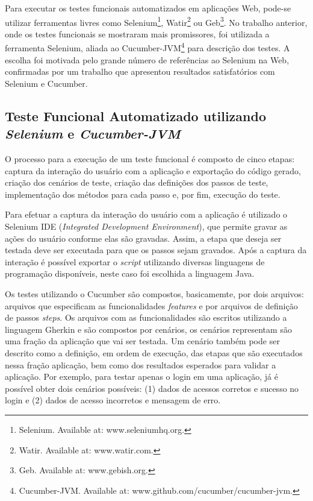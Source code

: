 \documentclass[12pt]{article}
\begin{document}
Para executar os testes funcionais automatizados em aplicações Web, pode-se utilizar ferramentas livres como Selenium\footnote{Selenium. Available at: www.seleniumhq.org.}, Watir\footnote{Watir. Available at: www.watir.com.} ou Geb\footnote{Geb. Available at: www.gebish.org.}. No trabalho anterior\cite{sbqs2015}, onde os testes funcionais se mostraram mais promissores, foi utilizada a ferramenta Selenium, aliada ao Cucumber-JVM\footnote{Cucumber-JVM. Available at: www.github.com/cucumber/cucumber-jvm.} para descrição dos testes. A escolha foi motivada pelo grande número de referências ao Selenium na Web, confirmadas por um trabalho que apresentou resultados satisfatórios com Selenium e Cucumber\cite{cucumberandselenium,sbqs2013}.



\subsection{Teste Funcional Automatizado utilizando \emph{Selenium} e \emph{Cucumber-JVM}}
O processo para a execução de um teste funcional é composto de cinco etapas: captura da interação do usuário com a aplicação e exportação do código gerado, criação dos cenários de teste, criação das definições dos passos de teste, implementação dos métodos para cada passo e, por fim, execução do teste.

Para efetuar a captura da interação do usuário com a aplicação é utilizado o Selenium IDE (\emph{Integrated Development Environment}), que permite gravar as ações do usuário conforme elas são gravadas. Assim, a etapa que deseja ser testada deve ser executada para que os passos sejam gravados. Após a captura da interação é possível exportar o \emph{script} utilizando diversas linguagens de programação disponíveis, neste caso foi escolhida a linguagem Java.

Os testes utilizando o Cucumber são compostos, basicamemte, por dois arquivos: arquivos que especificam as funcionalidades \emph{features} e por arquivos de definição de passos \emph{steps}. Os arquivos com as funcionalidades são escritos utilizando a linguagem Gherkin\cite{gherkin} e são compostos por cenários, os cenários representam são uma fração da aplicação que vai ser testada. Um cenário também pode ser descrito como a definição, em ordem de execução, das etapas que são executados nessa fração aplicação, bem como dos resultados esperados para validar a aplicação. Por exemplo, para testar apenas o login em uma aplicação, já é possível obter dois cenários possíveis: (1) dados de acessos corretos e sucesso no login e (2) dados de acesso incorretos e mensagem de erro.
\end{document}
